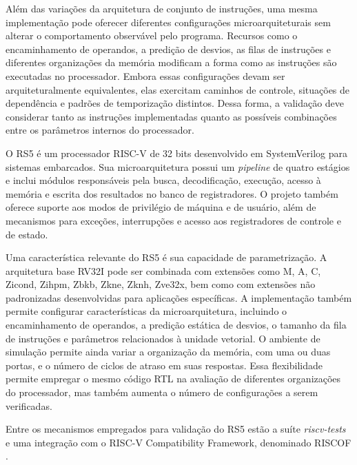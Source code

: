 Além das variações da arquitetura de conjunto de instruções, uma mesma implementação pode oferecer diferentes configurações microarquiteturais sem alterar o comportamento observável pelo programa. 
Recursos como o encaminhamento de operandos, a predição de desvios, as filas de instruções e diferentes organizações da memória modificam a forma como as instruções são executadas no processador. 
Embora essas configurações devam ser arquiteturalmente equivalentes, elas exercitam caminhos de controle, situações de dependência e padrões de temporização distintos. 
Dessa forma, a validação deve considerar tanto as instruções implementadas quanto as possíveis combinações entre os parâmetros internos do processador.

O RS5 \citep{Nunes:2024:RS5} é um processador RISC-V de 32 bits desenvolvido em SystemVerilog para sistemas embarcados. 
Sua microarquitetura possui um \textit{pipeline} de quatro estágios e inclui módulos responsáveis pela busca, decodificação, execução, acesso à memória e escrita dos resultados no banco de registradores. 
O projeto também oferece suporte aos modos de privilégio de máquina e de usuário, além de mecanismos para exceções, interrupções e acesso aos registradores de controle e de estado.

Uma característica relevante do RS5 é sua capacidade de parametrização. 
A arquitetura base RV32I pode ser combinada com extensões como M, A, C, Zicond, Zihpm, Zbkb, Zkne, Zknh, Zve32x, bem como com extensões não padronizadas desenvolvidas para aplicações específicas. 
A implementação também permite configurar características da microarquitetura, incluindo o encaminhamento de operandos, a predição estática de desvios, o tamanho da fila de instruções e parâmetros relacionados à unidade vetorial. 
O ambiente de simulação permite ainda variar a organização da memória, com uma ou duas portas, e o número de ciclos de atraso em suas respostas. 
Essa flexibilidade permite empregar o mesmo código RTL na avaliação de diferentes organizações do processador, mas também aumenta o número de configurações a serem verificadas.

Entre os mecanismos empregados para validação do RS5 estão a suíte \textit{riscv-tests} \citep{RISCV:2026:Tests} e uma integração com o RISC-V Compatibility Framework, denominado RISCOF \citep{InCore:2026:RISCOF}.

